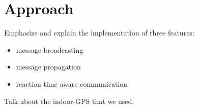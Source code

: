 \section{Approach}
\label{sec:solution}

Emphasize and explain the implementation of three features:
\begin{itemize}
\item message broadcasting
\item message propagation
\item reaction time aware communication
\end{itemize}

Talk about the indoor-GPS that we used.



